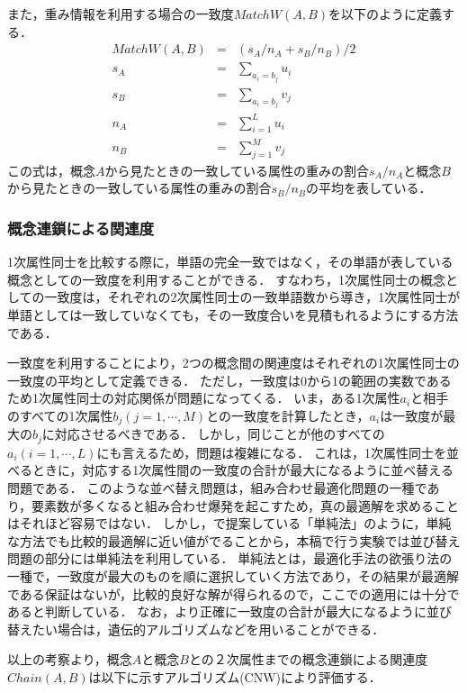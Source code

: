 また，重み情報を利用する場合の一致度$MatchW(A,B)$を以下のように定義する．\begin{eqnarray}
	MatchW(A,B) &=& (s_A/n_A + s_B/n_B)/2 	\label{EmatchW} \\
	s_A &=& \sum_{a_i=b_j} u_i \nonumber \\
	s_B &=& \sum_{a_i=b_j} v_j \nonumber \\
	n_A &=& \sum_{i=1}^L u_i \nonumber \\
	n_B &=& \sum_{j=1}^M v_j \nonumber 
\end{eqnarray}
この式は，概念$A$から見たときの一致している属性の重みの割合$s_A/n_A$と概念$B$から見たときの一致している属性の重みの割合$s_B/n_B$の平均を表している．


\subsubsection{概念連鎖による関連度}

1次属性同士を比較する際に，単語の完全一致ではなく，その単語が表している概念としての一致度を利用することができる．
すなわち，1次属性同士の概念としての一致度は，それぞれの2次属性同士の一致単語数から導き，1次属性同士が単語としては一致していなくても，その一致度合いを見積もれるようにする方法である．

一致度を利用することにより，2つの概念間の関連度はそれぞれの1次属性同士の一致度の平均として定義できる．
ただし，一致度は0から1の範囲の実数であるため1次属性同士の対応関係が問題になってくる．
いま，ある1次属性$a_i$と相手のすべての1次属性$b_j(j=1, \cdots, M)$との一致度を計算したとき，$a_i$は一致度が最大の$b_j$に対応させるべきである．
しかし，同じことが他のすべての$a_i(i=1, \cdots, L)$にも言えるため，問題は複雑になる．
これは，1次属性同士を並べるときに，対応する1次属性間の一致度の合計が最大になるように並べ替える問題である．
このような並べ替え問題は，組み合わせ最適化問題の一種であり，要素数が多くなると組み合わせ爆発を起こすため，真の最適解を求めることはそれほど容易ではない．
しかし，\cite{ukita}で提案している「単純法」のように，単純な方法でも比較的最適解に近い値がでることから，本稿で行う実験では並び替え問題の部分には単純法を利用している．
単純法とは，最適化手法の欲張り法の一種で，一致度が最大のものを順に選択していく方法であり，その結果が最適解である保証はないが，比較的良好な解が得られるので，ここでの適用には十分であると判断している．
なお，より正確に一致度の合計が最大になるように並び替えたい場合は，遺伝的アルゴリズムなどを用いることができる\cite{ukita}．

以上の考察より，概念$A$と概念$B$との２次属性までの概念連鎖による関連度$Chain(A,B)$は以下に示すアルゴリズム(CNW)により評価する．

